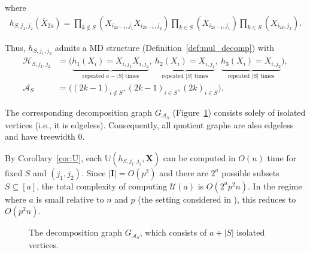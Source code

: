 \documentclass[12pt]{article}
\theoremstyle{plain}
\theoremstyle{definition}
\newcommand{\ustat}{\mathbb{U}}
\newcommand{\graphform}[1]{G_{#1}}
\def\calA{\mathcal{A}}
\def\calH{\mathcal{H}}
\begin{document}
\begin{bibunit}[agsm]
where
\begin{align*}
    h_{S,j_1,j_2}(\bar{X}_{2a}) 
    = \prod_{k \notin S} (X_{i_{2k-1},j_1} X_{i_{2k-1},j_2}) 
      \prod_{k \in S} (X_{i_{2k-1},j_1}) 
      \prod_{k \in S} (X_{i_{2k},j_2}).
\end{align*}

Thus, $h_{S,j_1,j_2}$ admits a MD structure (Definition~\ref{def:mul_decomp}) with 
\begin{align*}
    \calH_{S,j_1,j_2} &= \bigl( 
        \underbrace{h_1(X_i) = X_{i,j_1} X_{i,j_2}}_{\text{repeated } a - |S| \text{ times}},\ 
        \underbrace{h_2(X_i) = X_{i,j_1}}_{\text{repeated } |S| \text{ times}},\ 
        \underbrace{h_3(X_i) = X_{i,j_2}}_{\text{repeated } |S| \text{ times}}
    \bigr), \\
        \calA_S & = \bigl( (2k-1)_{i \notin S}, (2k-1)_{i \in S} , (2k)_{i \in S} \bigr).
\end{align*}

The corresponding decomposition graph $\graphform{\calA_S}$ (Figure~\ref{fig:decomp_graph_AS}) consists solely of isolated vertices (i.e., it is edgeless). Consequently, all quotient graphs are also edgeless and have treewidth 0.

By Corollary~\ref{cor:U}, each $\ustat(h_{S,j_1,j_2}, \bm{X})$ can be computed in $O(n)$ time for fixed $S$ and $(j_1,j_2)$. Since $|\mathbf{I}| = O(p^2)$ and there are $2^a$ possible subsets $S \subseteq [a]$, the total complexity of computing $\mathcal{U}(a)$ is $O(2^a p^2 n)$. In the regime where $a$ is small relative to $n$ and $p$ (the setting considered in \cite{he2021asymptotically}), this reduces to $O(p^2 n)$.

\begin{figure}[h!]
    \centering
    \caption{The decomposition graph $\graphform{\calA_{S}}$, which consists of $a + |S|$ isolated vertices.}
    \label{fig:decomp_graph_AS}
\end{figure}


\end{bibunit}
\end{document}
